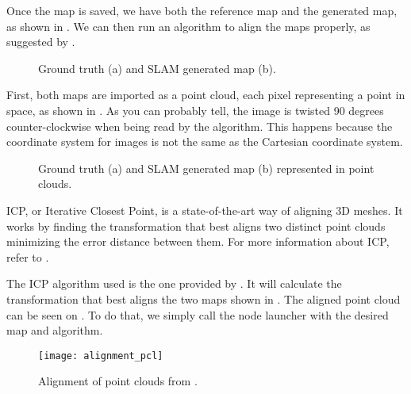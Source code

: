 Once the map is saved, we have both the reference map and the generated map, as shown in . We can then run an algorithm to align the maps properly, as suggested by \citeauthor{santos2013evaluation}.

\begin{figure}[!ht]
     \centering
     \hspace{2cm}
     \caption{Ground truth (a) and SLAM generated map (b).}
     \label{fig:reference_map_icp}
\end{figure}

First, both maps are imported as a point cloud, each pixel representing a point in space, as shown in . As you can probably tell, the image is twisted 90 degrees counter-clockwise when being read by the algorithm. This happens because the coordinate system for images is not the same as the Cartesian coordinate system.

\begin{figure}[!ht]
     \centering
     \hspace{0cm}
     \caption{Ground truth (a) and SLAM generated map (b) represented in point clouds.}
     \label{fig:point_cloud}
\end{figure}

ICP, or Iterative Closest Point, is a state-of-the-art way of aligning 3D meshes. It works by finding the transformation that best aligns two distinct point clouds minimizing the error distance between them. For more information about ICP, refer to \citeauthor{besl1992method}.

The ICP algorithm used is the one provided by \citeauthor{flannigan2019}. It will calculate the transformation that best aligns the two maps shown in . The aligned point cloud can be seen on . To do that, we simply call the node launcher with the desired map and algorithm. 

\begin{figure}[!ht]
    \centering
    \texttt{[image: alignment\_pcl]}
    \caption{Alignment of point clouds from .}
    \label{fig:alignment_pcl}
\end{figure}

